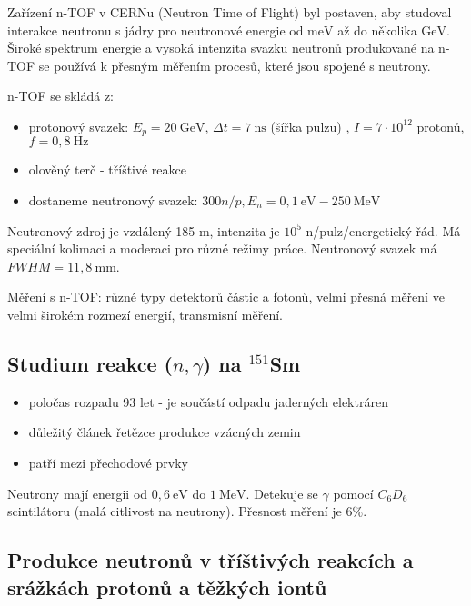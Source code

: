 \documentclass[../../main.tex]{subfiles}
\begin{document}
Zařízení n-TOF v CERNu (Neutron Time of Flight) byl postaven, aby studoval interakce neutronu s jádry pro neutronové energie od $\mathrm{meV}$ až do několika  $\mathrm{GeV}$. Široké spektrum energie a vysoká intenzita svazku neutronů produkované na n-TOF se používá k přesným měřením procesů, které jsou spojené s neutrony.

n-TOF se skládá z:
\begin{itemize}
	\item protonový svazek: $E_p = 20 ~\mathrm{GeV}$, $\Delta t = 7 ~\mathrm{ns}$ (šířka pulzu) , $I = 7 \cdotp 10^{12}$ protonů, $f = 0,8 ~\mathrm{Hz}$
	\item olověný terč - tříštivé reakce
	\item dostaneme neutronový svazek: $300 n/p, E_n = 0,1 ~\mathrm{eV} - 250 ~\mathrm{MeV}$
\end{itemize}
Neutronový zdroj je vzdálený 185 $\mathrm{m}$, intenzita je $10^5$ n/pulz/energetický řád. Má speciální kolimaci a moderaci pro různé režimy práce. Neutronový svazek má $FWHM = 11,8 ~\mathrm{mm}$. 

Měření s n-TOF: různé typy detektorů částic a fotonů, velmi přesná měření ve velmi širokém rozmezí energií, transmisní měření.

\subsection{Studium reakce ($n, \gamma$) na $^{151}$Sm}

\begin{itemize}
	\item poločas rozpadu 93 let - je součástí odpadu jaderných elektráren
	\item důležitý článek řetězce produkce vzácných zemin
	\item patří mezi přechodové prvky
\end{itemize}

Neutrony mají energii od $0,6 ~\mathrm{eV}$ do $1 ~\mathrm{MeV}$. Detekuje se $\gamma$ pomocí $C_6 D_6$ scintilátoru (malá citlivost na neutrony). Přesnost měření je $6 \%$.


\subsection{Produkce neutronů v tříštivých reakcích a srážkách protonů a těžkých iontů}
\end{document}

